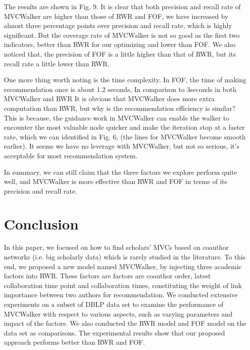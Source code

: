 \documentclass[10pt,journal,compsoc]{IEEEtran}
\begin{document}
The results are shown in Fig. 9. It is clear that both precision and recall rate of MVCWalker are higher than those of RWR and FOF, we have increased by almost three percentage points over precision and recall rate, which is highly significant. But the coverage rate of MVCWalker is not so good as the first two indicators, better than RWR for our optimizing and lower than FOF. We also noticed that, the precision of FOF is a little higher than that of RWR, but its recall rate a little lower than RWR.

One more thing worth noting is the time complexity. In FOF, the time of making recommendation once is about 1.2 seconds, In comparison to 3seconds in both MVCWalker and RWR It is obvious that MVCWalker does more extra computation than RWR, but why is the recommendation efficiency is similar? This is because, the guidance work in MVCWalker can enable the walker to encounter the most valuable node quicker and make the iteration stop at a faster rate, which we can identified in Fig. 6, (the lines for MVCWalker become smooth earlier). It seems we have no leverage with MVCWalker, but not so serious, it's acceptable for most recommendation system.

In summary, we can still claim that the three factors we explore perform quite well, and MVCWalker is more effective than RWR and FOF in terms of its precision and recall rate.



\section{Conclusion}
In this paper, we focused on how to find scholars' MVCs based on coauthor networks (i.e. big scholarly data) which is rarely studied in the literature. To this end, we proposed a new model named MVCWalker, by injecting three academic factors into RWR. These factors are factors are coauthor order, latest collaboration time point and collaboration times, constituting the weight of link importance between two authors for recommendation. We conducted extensive experiments on a subset of DBLP data set to examine the performance of MVCWalker with respect to various aspects, such as varying parameters and impact of the factors. We also conducted the RWR model and FOF model on the data set as comparisons. The experimental results show that our proposed approach performs better than RWR and FOF.
\end{document}
